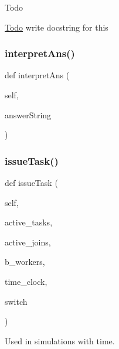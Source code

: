 \begin{DoxyRefDesc}{Todo}
\item[\mbox{\hyperlink{todo__todo000006}{Todo}}]write docstring for this \end{DoxyRefDesc}
\mbox{\label{classdynamicfilterapp_1_1test__simulations_1_1_simulation_test_a2b105c6da535dfcd9ad506bd77a5c574}} 
\subsubsection{\texorpdfstring{interpretAns()}{interpretAns()}}
{\footnotesize\ttfamily def interpret\+Ans (\begin{DoxyParamCaption}\item[{}]{self,  }\item[{}]{answer\+String }\end{DoxyParamCaption})}

\mbox{\label{classdynamicfilterapp_1_1test__simulations_1_1_simulation_test_a1053a9c96fb2665adc869c558b818a47}} 
\subsubsection{\texorpdfstring{issueTask()}{issueTask()}}
{\footnotesize\ttfamily def issue\+Task (\begin{DoxyParamCaption}\item[{}]{self,  }\item[{}]{active\+\_\+tasks,  }\item[{}]{active\+\_\+joins,  }\item[{}]{b\+\_\+workers,  }\item[{}]{time\+\_\+clock,  }\item[{}]{switch }\end{DoxyParamCaption})}



Used in simulations with time. 

